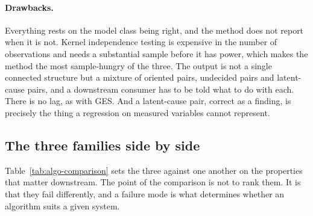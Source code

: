 \paragraph{Drawbacks.} Everything rests on the model class being right, and the method does not report when it is not. Kernel independence testing is expensive in the number of observations and needs a substantial sample before it has power, which makes the method the most sample-hungry of the three. The output is not a single connected structure but a mixture of oriented pairs, undecided pairs and latent-cause pairs, and a downstream consumer has to be told what to do with each. There is no lag, as with GES. And a latent-cause pair, correct as a finding, is precisely the thing a regression on measured variables cannot represent.

\subsection{The three families side by side}
\label{sec:bg-comparison}

Table~\ref{tab:algo-comparison} sets the three against one another on the properties that matter downstream. The point of the comparison is not to rank them. It is that they fail differently, and a failure mode is what determines whether an algorithm suits a given system.

